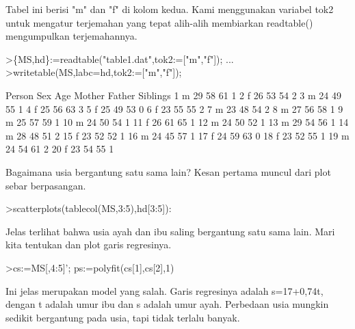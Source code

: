 \documentclass[a4paper,10pt]{article}
\begin{document}
\begin{eulernotebook}
\begin{eulercomment}
\begin{eulercomment}
\begin{eulercomment}
Tabel ini berisi "m" dan "f" di kolom kedua. Kami menggunakan variabel
tok2 untuk mengatur terjemahan yang tepat alih-alih membiarkan
readtable() mengumpulkan terjemahannya.
\end{eulercomment}
\begin{eulerprompt}
>\{MS,hd\}:=readtable("table1.dat",tok2:=["m","f"]);  ...
>writetable(MS,labc=hd,tok2:=["m","f"]);
\end{eulerprompt}
\begin{euleroutput}
      Person       Sex       Age    Mother    Father  Siblings
           1         m        29        58        61         1
           2         f        26        53        54         2
           3         m        24        49        55         1
           4         f        25        56        63         3
           5         f        25        49        53         0
           6         f        23        55        55         2
           7         m        23        48        54         2
           8         m        27        56        58         1
           9         m        25        57        59         1
          10         m        24        50        54         1
          11         f        26        61        65         1
          12         m        24        50        52         1
          13         m        29        54        56         1
          14         m        28        48        51         2
          15         f        23        52        52         1
          16         m        24        45        57         1
          17         f        24        59        63         0
          18         f        23        52        55         1
          19         m        24        54        61         2
          20         f        23        54        55         1
\end{euleroutput}
\begin{eulercomment}
Bagaimana usia bergantung satu sama lain? Kesan pertama muncul dari
plot sebar berpasangan.
\end{eulercomment}
\begin{eulerprompt}
>scatterplots(tablecol(MS,3:5),hd[3:5]):
\end{eulerprompt}
\begin{eulercomment}
Jelas terlihat bahwa usia ayah dan ibu saling bergantung satu sama
lain. Mari kita tentukan dan plot garis regresinya.
\end{eulercomment}
\begin{eulerprompt}
>cs:=MS[,4:5]'; ps:=polyfit(cs[1],cs[2],1)
\end{eulerprompt}
\begin{euleroutput}
  [17.3789,  0.740964]
\end{euleroutput}
\begin{eulercomment}
Ini jelas merupakan model yang salah. Garis regresinya adalah
s=17+0,74t, dengan t adalah umur ibu dan s adalah umur ayah. Perbedaan
usia mungkin sedikit bergantung pada usia, tapi tidak terlalu banyak.


\end{eulercomment}
\end{eulercomment}
\end{eulercomment}
\end{eulernotebook}
\end{document}
